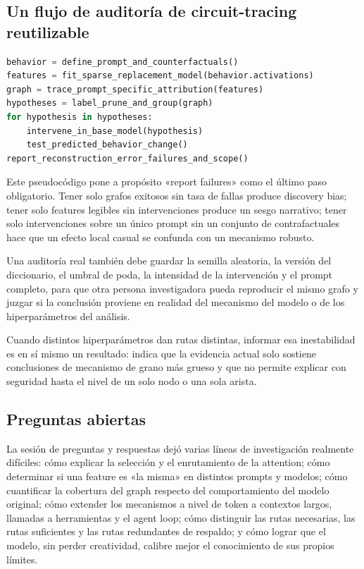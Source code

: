 \subsection{Un flujo de auditoría de circuit-tracing reutilizable}

\begin{lstlisting}[language=Python,caption={Flujo de auditoría que va de un problema de comportamiento a hipótesis de mecanismo falsables}]
behavior = define_prompt_and_counterfactuals()
features = fit_sparse_replacement_model(behavior.activations)
graph = trace_prompt_specific_attribution(features)
hypotheses = label_prune_and_group(graph)
for hypothesis in hypotheses:
    intervene_in_base_model(hypothesis)
    test_predicted_behavior_change()
report_reconstruction_error_failures_and_scope()
\end{lstlisting}

Este pseudocódigo pone a propósito «report failures» como el último paso obligatorio. Tener solo grafos exitosos sin tasa de fallas produce discovery bias; tener solo features legibles sin intervenciones produce un sesgo narrativo; tener solo intervenciones sobre un único prompt sin un conjunto de contrafactuales hace que un efecto local casual se confunda con un mecanismo robusto.

Una auditoría real también debe guardar la semilla aleatoria, la versión del diccionario, el umbral de poda, la intensidad de la intervención y el prompt completo, para que otra persona investigadora pueda reproducir el mismo grafo y juzgar si la conclusión proviene en realidad del mecanismo del modelo o de los hiperparámetros del análisis.

Cuando distintos hiperparámetros dan rutas distintas, informar esa inestabilidad es en sí mismo un resultado: indica que la evidencia actual solo sostiene conclusiones de mecanismo de grano más grueso y que no permite explicar con seguridad hasta el nivel de un solo nodo o una sola arista.

\subsection{Preguntas abiertas}

La sesión de preguntas y respuestas dejó varias líneas de investigación realmente difíciles: cómo explicar la selección y el enrutamiento de la attention; cómo determinar si una feature es «la misma» en distintos prompts y modelos; cómo cuantificar la cobertura del graph respecto del comportamiento del modelo original; cómo extender los mecanismos a nivel de token a contextos largos, llamadas a herramientas y el agent loop; cómo distinguir las rutas necesarias, las rutas suficientes y las rutas redundantes de respaldo; y cómo lograr que el modelo, sin perder creatividad, calibre mejor el conocimiento de sus propios límites.

